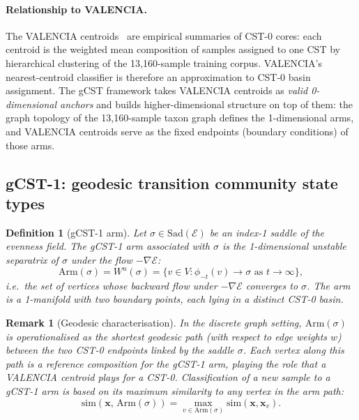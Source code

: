 \documentclass[11pt]{article}
\theoremstyle{plain}
\newtheorem{definition}{Definition}[section]
\newtheorem{remark}{Remark}[section]
\newcommand{\E}{\mathcal{E}}
\newcommand{\Sad}{\mathrm{Sad}}
\begin{document}
\paragraph{Relationship to VALENCIA.}
The VALENCIA centroids~\cite{france2020} are empirical summaries of CST-0
cores: each centroid is the weighted mean composition of samples assigned to
one CST by hierarchical clustering of the 13{,}160-sample training corpus.
VALENCIA's nearest-centroid classifier is therefore an approximation to
CST-0 basin assignment.  The gCST framework takes VALENCIA centroids as
\emph{valid 0-dimensional anchors} and builds higher-dimensional structure on
top of them: the graph topology of the 13{,}160-sample taxon graph defines
the 1-dimensional arms, and VALENCIA centroids serve as the fixed endpoints
(boundary conditions) of those arms.

\subsection{gCST-1: geodesic transition community state types}
\label{sec:gcst1}

\begin{definition}[gCST-1 arm]
  Let $\sigma \in \Sad(\E)$ be an index-1 saddle of the evenness field.
  The \emph{gCST-1 arm associated with $\sigma$} is the 1-dimensional unstable
  separatrix of $\sigma$ under the flow $-\nabla\E$:
  \[
    \mathrm{Arm}(\sigma) =
      W^u(\sigma) =
      \{v \in V : \phi_{-t}(v) \to \sigma \text{ as } t \to \infty\},
  \]
  i.e.\ the set of vertices whose \emph{backward} flow under $-\nabla\E$
  converges to $\sigma$.  The arm is a 1-manifold with two boundary
  points, each lying in a distinct CST-0 basin.
\end{definition}

\begin{remark}[Geodesic characterisation]
  In the discrete graph setting, $\mathrm{Arm}(\sigma)$ is operationalised as
  the \emph{shortest geodesic path} (with respect to edge weights $w$) between
  the two CST-0 endpoints linked by the saddle $\sigma$.  Each vertex along
  this path is a \emph{reference composition} for the gCST-1 arm, playing the
  role that a VALENCIA centroid plays for a CST-0.  Classification of a new
  sample to a gCST-1 arm is based on its maximum similarity to any vertex in
  the arm path:
  \[
    \mathrm{sim}(\mathbf{x},\, \mathrm{Arm}(\sigma))
      = \max_{v \in \mathrm{Arm}(\sigma)} \mathrm{sim}(\mathbf{x}, \mathbf{x}_v).
  \]
\end{remark}
\end{document}
